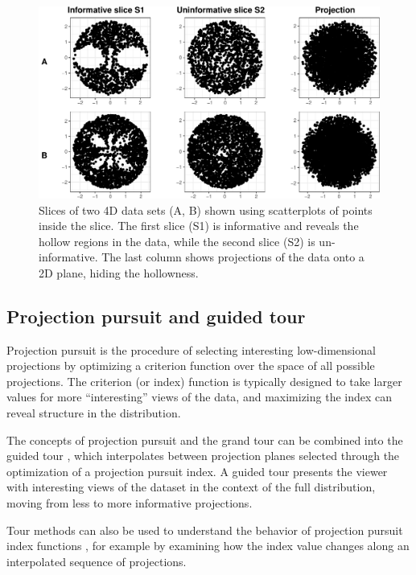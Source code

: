 \documentclass[]{interact}
\theoremstyle{plain}%
\theoremstyle{definition}
\theoremstyle{remark}
\begin{document}
\begin{figure}

{\centering \includegraphics[width=0.8\linewidth]{section_pursuit_files/figure-latex/allSlices-1} 

}

\caption{Slices of two 4D data sets (A, B) shown using scatterplots of points inside the slice. The first slice (S1) is informative and reveals the hollow regions in the data, while the second slice (S2) is un-informative. The last column shows projections of the data onto a 2D plane, hiding the hollowness.}\label{fig:allSlices}
\end{figure}

\hypertarget{projection-pursuit-and-guided-tour}{%
\subsection{Projection pursuit and guided
tour}\label{projection-pursuit-and-guided-tour}}

Projection pursuit is the procedure of selecting interesting
low-dimensional projections by optimizing a criterion function over the
space of all possible projections. The criterion (or index) function is
typically designed to take larger values for more ``interesting'' views
of the data, and maximizing the index can reveal structure in the
distribution.

The concepts of projection pursuit and the grand tour can be combined
into the guided tour \citep{CBCH94}, which interpolates between
projection planes selected through the optimization of a projection
pursuit index. A guided tour presents the viewer with interesting views
of the dataset in the context of the full distribution, moving from less
to more informative projections.

Tour methods can also be used to understand the behavior of projection
pursuit index functions \citep{laa2020}, for example by examining how
the index value changes along an interpolated sequence of projections.
\end{document}
